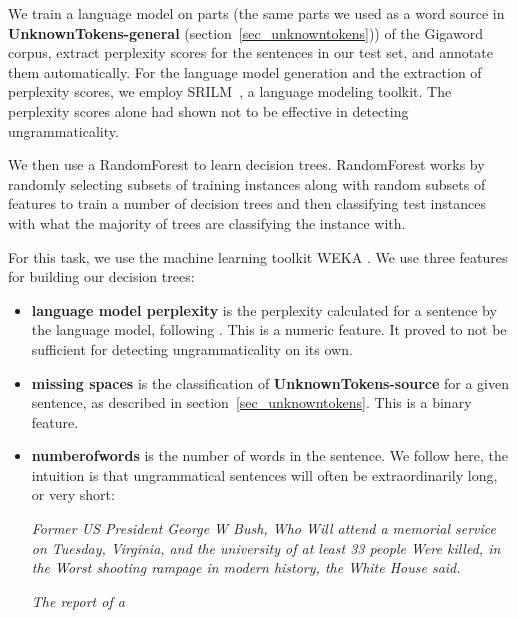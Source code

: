 \documentclass[a4paper,10pt]{scrartcl}
\theoremstyle{style}
\begin{document}
We train a language model on parts (the same parts we used as a word source in \textbf{UnknownTokens-general} (section~\ref{sec_unknowntokens})) of the Gigaword corpus\citep{gigaword}, extract perplexity scores for the sentences in our test set, and annotate them automatically. For the language model generation and the extraction of perplexity scores, we employ SRILM~\citep{stolcke2002srilm}, a language modeling toolkit. The perplexity scores alone had shown not to be effective in detecting ungrammaticality.


We then use a RandomForest \citep{breiman2001random} to learn decision trees.
RandomForest works by randomly selecting subsets of training instances along with random subsets of features to train a number of decision trees and then classifying test instances with what the majority of trees are classifying the instance with.

For this task, we use the machine learning toolkit WEKA \citep{hall2009weka}.
We use three features for building our decision trees:

\begin{itemize}
	\item \textbf{language model perplexity} is the perplexity calculated for a sentence by the language model, following \cite{sun2007detecting}. This is a numeric feature. It proved to not be sufficient for detecting ungrammaticality on its own.
	\item \textbf{missing spaces} is the classification of \textbf{UnknownTokens-source} for a given sentence, as described in section~\ref{sec_unknowntokens}. This is a binary feature.
	\item \textbf{numberofwords} is the number of words in the sentence. We follow \cite{wagner2007comparative} here, the intuition is that ungrammatical sentences will often be extraordinarily long, or very short:

		\textit{Former US President George W Bush, Who Will attend a memorial service on Tuesday, Virginia, and the university of at least 33 people Were killed, in the Worst shooting rampage in modern history, the White House said.}

		\textit{The report of a}
\end{itemize}

\end{document}
